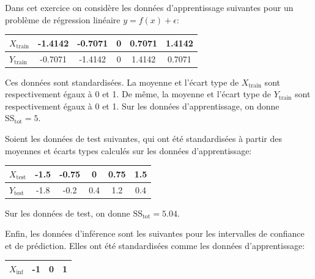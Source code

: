 \documentclass[]{../exercices}
\begin{document}

	\begin{exercice}
		Dans cet exercice on considère les données d'apprentissage suivantes pour un problème de régression linéaire $y = f(x) + \epsilon$:

		\begin{table}[!h]
			\centering
			\begin{tabular}{@{}|lccccc|@{}}
				\hline
				$X_{\text{train}}$ & -1.4142 & -0.7071 & 0 & 0.7071 & 1.4142 \\
				\hline
				$Y_{\text{train}}$ & -0.7071 & -1.4142 & 0 & 1.4142 & 0.7071 \\
				\hline
			\end{tabular}%
		\end{table}

		Ces données sont standardisées. La moyenne et l'écart type de $X_{\text{train}}$ sont respectivement égaux à 0 et 1. De même, la moyenne et l'écart type de $Y_{\text{train}}$ sont respectivement égaux à 0 et 1. Sur les données d'apprentissage, on donne $\text{SS}_{\text{tot}} = 5$.

		Soient les données de test suivantes, qui ont été standardisées à partir des moyennes et écarts types calculés sur les données d'apprentissage:

		\begin{table}[!h]
			\centering
			\begin{tabular}{@{}|lccccc|@{}}
				\hline
				$X_{\text{test}}$ & -1.5 & -0.75 & 0 & 0.75 & 1.5 \\
				\hline
				$Y_{\text{test}}$ & -1.8 & -0.2 & 0.4 & 1.2 & 0.4 \\
				\hline
			\end{tabular}%
		\end{table}

		Sur les données de test, on donne $\text{SS}_{\text{tot}} = 5.04$.

		Enfin, les données d'inférence sont les suivantes pour les intervalles de confiance et de prédiction. Elles ont été standardisées comme les données d'apprentissage:

		\begin{table}[!h]
			\centering
			\begin{tabular}{@{}|lccc|@{}}
				\hline
				$X_{\text{inf}}$ & -1 & 0 & 1 \\
				\hline
			\end{tabular}%
		\end{table}


\end{exercice}
\end{document}
